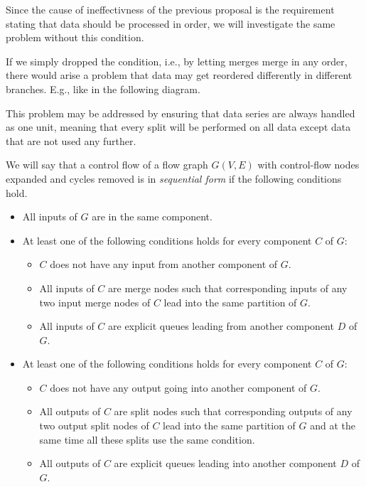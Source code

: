 Since the cause of ineffectivness of the previous proposal is the requirement stating that data should be processed in order, we will investigate the same problem without this condition. 

\parspace

If we simply dropped the condition, i.e., by letting merges merge in any order, there would arise a problem that data may get reordered differently in different branches. E.g., like in the following diagram.


This problem may be addressed by ensuring that data series are always handled as one unit, meaning that every split will be performed on all data except data that are not used any further.

\begin{define}
We will say that a control flow of a flow graph $G(V,E)$ with control-flow nodes expanded and cycles removed is in \emph{sequential form} if the following conditions hold.
\begin{itemize}
  \item All inputs of $G$ are in the same component.
  \item At least one of the following conditions holds for every component $C$ of $G$: 
    \begin{itemize}
      \item $C$ does not have any input from another component of $G$.
      \item All inputs of $C$ are merge nodes such that corresponding inputs of any two input merge nodes of $C$ lead into the same partition of $G$.
      \item All inputs of $C$ are explicit queues leading from another component $D$ of $G$.
    \end{itemize}
  \item At least one of the following conditions holds for every component $C$ of $G$: 
    \begin{itemize}
      \item $C$ does not have any output going into another component of $G$.
      \item All outputs of $C$ are split nodes such that corresponding outputs of any two output split nodes of $C$ lead into the same partition of $G$ and at the same time all these splits use the same condition.
      \item All outputs of $C$ are explicit queues leading into another component $D$ of $G$.
    \end{itemize}
\end{itemize}
\end{define}

